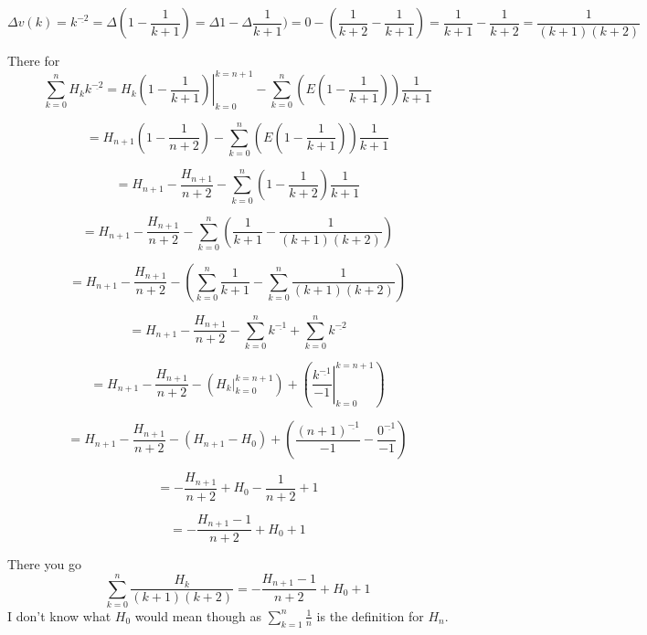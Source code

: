 \documentclass[10pt, AMS Euler]{article}
\newcommand{\ds}{\displaystyle}
\begin{document}
                $$ \Delta v(k) = k^{\underline{-2}} = \Delta (1 - \frac{1}{k+1}) = \Delta 1 - \Delta \frac{1}{k+1}) = 0 - (\frac{1}{k+2} - \frac{1}{k+1}) = \frac{1}{k+1} - \frac{1}{k+2} = \frac{1}{(k+1)(k+2)} $$

            There for
                $$\sum_{k=0}^n H_k k^{\underline{-2}} = \ds\left . H_k (1-\frac{1}{k+1}) \right|_{k=0}^{k=n+1}  - \sum_{k=0}^n (E(1-\frac{1}{k+1})) \frac{1}{k+1} $$
                
                $$=H_{n+1}(1-\frac{1}{n+2})-\sum_{k=0}^n (E(1-\frac{1}{k+1})) \frac{1}{k+1}$$

                $$ = H_{n+1}-\frac{H_{n+1}}{n+2}-\sum_{k=0}^n (1-\frac{1}{k+2}) \frac{1}{k+1} $$

                $$ = H_{n+1}-\frac{H_{n+1}}{n+2}-\sum_{k=0}^n (\frac{1}{k+1}-\frac{1}{(k+1)(k+2)}) $$

                $$ = H_{n+1}-\frac{H_{n+1}}{n+2}-(\sum_{k=0}^n \frac{1}{k+1}-\sum_{k=0}^n\frac{1}{(k+1)(k+2)}) $$

                $$ = H_{n+1}-\frac{H_{n+1}}{n+2}-\sum_{k=0}^n k^{\underline{-1}} + \sum_{k=0}^n k^{\underline{-2}} $$

                $$ = H_{n+1}-\frac{H_{n+1}}{n+2} - (\ds\left .H_k\right|_{k=0}^{k=n+1}) + (\ds\left .\frac{k^{\underline{-1}}}{-1}\right|_{k=0}^{k=n+1}) $$

                $$ = H_{n+1}-\frac{H_{n+1}}{n+2} - (H_{n+1} - H_0) + (\frac{(n+1)^{\underline{-1}}}{-1} - \frac{0^{\underline{-1}}}{-1}) $$

                $$ = - \frac{H_{n+1}}{n+2} + H_0 - \frac{1}{n+2} + 1 $$

                $$ = - \frac{H_{n+1}-1}{n+2} + H_0 + 1 $$

            There you go
                $$ \sum_{k=0}^n\frac{H_k}{(k+1)(k+2)} = - \frac{H_{n+1}-1}{n+2} + H_0 + 1 $$
            I don't know what $H_0$ would mean though as $\sum_{k=1}^n \frac{1}{n}$ is the definition for $H_n$.

	\noindent \underline{\hspace{3in}}\\
	
	
	
	
\end{document}
